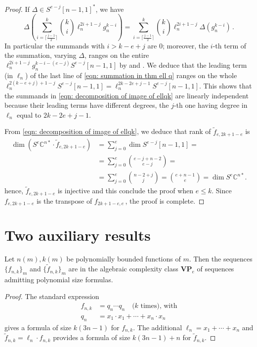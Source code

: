 \documentclass{toc}
\newcommand{\textbinom}[2]{{\textstyle \binom{#1}{#2}}}
\newcommand{\bbC}{\mathbb{C}}
\renewcommand{\tilde}[1]{\widetilde{#1}}
\newcommand{\bfVP}{\mathbf{VP}}
\begin{document}
\begin{proof}
If $\Delta \in S^{e-j} [n-1,1]^* $, we have
\[
  \Delta \left( \sum_{i=\lceil \frac{j-1}{2}\rceil}^k \textbinom{k}{i} \ell_n^{2i+1 - j} g_n^{k-i}\right) = \sum_{i=\lceil \frac{j-1}{2}\rceil}^{k} \textbinom{k}{i} \ell_n^{2i+1 - j} \Delta( g_n^{k-i})\,.
\]
In particular the summands with $i > k-e+j$ are $0$; moreover, the
$i$-th term of the summation, varying $\Delta$, ranges on the entire
$\ell_n^{2i+1-j} g_n^{k-i-(e-j)} S^{e-j} [n-1,1]$ by
 and
. We deduce that
the leading term (in $\ell_n$) of the last line of \eqref{eqn:
  summation in thm ell q} ranges on the whole
$\ell_n^{2(k-e+j) +1 -j } S^{e-j} [n-1,1] = \ell_n^{2k-2e+j -1}
S^{e-j} [n-1,1]$. This shows that the summands in \eqref{eqn:
  decomposition of image of ellqk} are linearly independent because
their leading terms have different degrees, the $j$-th one having
degree in $\ell_n$ equal to $2k-2e+j -1$.

{}From \eqref{eqn: decomposition of image of ellqk}, we deduce that rank of $\tilde{f}_{e,2k+1-e}$ is 
\begin{align*}
 \dim (S^e \bbC^{n*} \cdot \tilde{f}_{e,2k+1-e} ) &= \sum_{j = 0}^e \dim S^{e-j} [n-1,1] = \\ &= \sum_{j=0}^e \binom{e-j+n-2}{e-j} = \\ &=\sum_{j=0}^e \binom{n-2+j}{j} = \binom{e+n-1}{e} = \dim S^e \bbC^{n*}.
\end{align*}
hence, $\tilde{f}_{e,2k+1-e}$ is injective and this conclude the proof when $e \leq k$. Since $f_{e,2k+1-e}$ is the transpose of $f_{2k+1-e,e}$\,, the proof is complete.
\end{proof}

\section{Two auxiliary results}
 
 
  \begin{proposition} \label{vpeprop}
 Let $n(m),k(m)$ be   polynomially bounded functions of $m$. Then the sequences $\{f_{n,k}\}_m$ and $\{\tilde f_{n,k}\}_m$ are   in the algebraic complexity class $\bfVP_e$ of sequences admitting polynomial size formulas.
 \end{proposition}  
 

\begin{proof}
The standard expression
\begin{align*}
f_{n,k} &= q_n \cdots q_n \quad \text{($k$ times), with} \\
q_n &= x_1 \cdot x_1 + \cdots + x_n \cdot x_n
\end{align*}
gives a formula of size $k(3n-1)$ for $f_{n,k}$. The additional $\ell_n = x_1 + \cdots + x_n$ and $\tilde{f}_{n,k} = \ell_n \cdot f_{n,k}$ provides a formula of size $k(3n-1)+n$ for $\tilde{f}_{n,k}$.
\end{proof}
\end{document}
